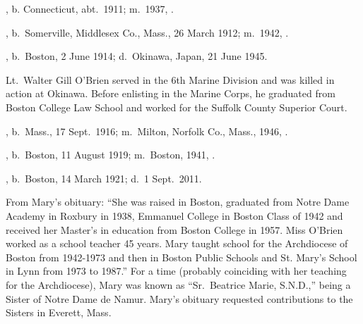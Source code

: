 \begin{Kids}
	, b. Connecticut, abt.\ 1911; m.\ 1937, .
	
	, b.\ Somerville, Middlesex Co., Mass., 26 March 1912; m.\ 1942, .
	
	, b.\ Boston, 2 June 1914;\cite{Walter4OBrienBirth} d.\ Okinawa, Japan, 21 June 1945.\cite{Walter4OBrienDeath}
	
	\begin{KidsMoreText}
		Lt.\ Walter Gill O'Brien served in the 6th Marine Division and was killed in action at Okinawa.\cite{Walter4OBrienDeath} Before enlisting in the Marine Corps, he graduated from Boston College Law School and worked for the Suffolk County Superior Court.\cite{Walter4OBrienPromotion}
	\end{KidsMoreText}
	
	, b.\ Mass., 17 Sept.\ 1916; m.\ Milton, Norfolk Co., Mass., 1946, .
	
	, b.\ Boston, 11 August 1919; m.\ Boston, 1941, .
	
	, b.\ Boston, 14 March 1921;\cite{Mary4OBrienBirth,Mary4OBrienBirth2} d.\ 1 Sept.\ 2011.\cite{Mary4OBrienBirth,Mary4OBrienDeath}
	
	\begin{KidsMoreText}
		From Mary's obituary: ``She was raised in Boston, graduated from Notre Dame Academy in Roxbury in 1938, Emmanuel College in Boston Class of 1942 and received her Master's in education from Boston College in 1957. Miss O'Brien worked as a school teacher 45 years. Mary taught school for the Archdiocese of Boston from 1942-1973 and then in Boston Public Schools and St. Mary's School in Lynn from 1973 to 1987.''\cite{Mary4OBrienDeath} For a time (probably coinciding with her teaching for the Archdiocese), Mary was known as ``Sr.\ Beatrice Marie, S.N.D.,'' being a Sister of Notre Dame de Namur. \cite{Epilogue,MaryGillDeath} Mary's obituary requested contributions to the Sisters in Everett, Mass.\cite{Mary4OBrienDeath}
	\end{KidsMoreText}
	
\end{Kids}